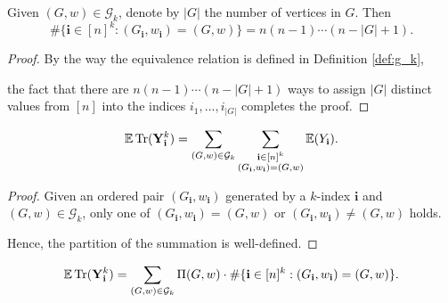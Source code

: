 
\begin{lemma}
  \label{lem:lem_4.3}
  Given $(G,w) \in \mathcal{G}_k$, denote by $|G|$ the number of vertices in $G$. Then
  \[
  \# \{ \mathbf{i} \in [n]^k : (G_\mathbf{i},w_\mathbf{i}) = (G,w) \} = n (n-1) \cdots (n - |G| + 1).
  \]
\end{lemma}
\begin{proof}
  By the way the equivalence relation is defined in Definition \ref{def:g_k}, 

  the fact that there are $n (n - 1) \cdots (n -|G| + 1)$ ways to assign $|G|$ distinct values from $[n]$ into the indices $i_1,...,i_{|G|}$ completes the proof.
\end{proof}
\begin{lemma}
  \label{lem:equation_4.5_1}
  \[
  \mathbb{E} \operatorname{Tr} (\mathbf{Y}_\mathbf{i}^k) = \sum_{(G,w) \in \mathcal{G}_k} \sum_{\substack{\mathbf{i} \in [n]^k \\ (G_\mathbf{i},w_\mathbf{i}) = (G,w)}} \mathbb{E} (Y_\mathbf{i}).
  \]
\end{lemma}
\begin{proof}
  Given an ordered pair $(G_\mathbf{i},w_\mathbf{i})$ generated by a $k$-index $\mathbf{i}$ and $(G,w) \in \mathcal{G}_k$, 
  only one of $(G_\mathbf{i},w_\mathbf{i}) = (G,w)$ or $(G_\mathbf{i},w_\mathbf{i}) \neq (G,w)$ holds. 

  Hence, the partition of the summation is well-defined.
\end{proof}
\begin{lemma}
  \label{lem:equation_4.5_2}
  \[
  \mathbb{E} \operatorname{Tr} (\mathbf{Y}_\mathbf{i}^k) = \sum_{(G,w) \in \mathcal{G}_k} \Pi (G,w) \cdot \# \{ \mathbf{i} \in [n]^k : (G_\mathbf{i},w_\mathbf{i}) = (G,w) \}.
  \]
\end{lemma}
